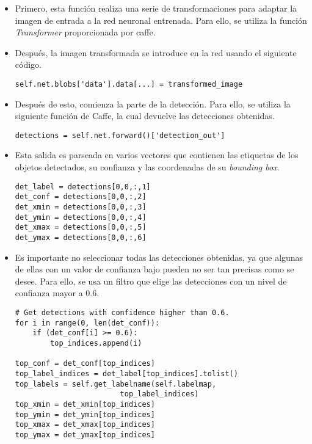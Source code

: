\documentclass[a4paper, 12pt, oneside]{book}
\begin{document}
\begin{itemize}
\item Primero, esta función realiza una serie de transformaciones para adaptar la imagen de entrada a la red neuronal entrenada. Para ello, se utiliza la función \textit{Transformer} proporcionada por caffe. 
\item Después, la imagen transformada se introduce en la red usando el siguiente código.\\

\begin{lstlisting}[frame=single]
self.net.blobs['data'].data[...] = transformed_image
\end{lstlisting}

\item Después de esto, comienza la parte de la detección. Para ello, se utiliza la siguiente función de Caffe, la cual devuelve las detecciones obtenidas.\\

\begin{lstlisting}[frame=single]
detections = self.net.forward()['detection_out']
\end{lstlisting}

\item Esta salida es parseada en varios vectores que contienen las etiquetas de los objetos detectados, su confianza y las coordenadas de su \textit{bounding box}.\\

\begin{lstlisting}[frame=single]
det_label = detections[0,0,:,1] 
det_conf = detections[0,0,:,2] 
det_xmin = detections[0,0,:,3] 
det_ymin = detections[0,0,:,4] 
det_xmax = detections[0,0,:,5] 
det_ymax = detections[0,0,:,6]
\end{lstlisting}

\item Es importante no seleccionar todas las detecciones obtenidas, ya que algunas de ellas con un valor de confianza bajo pueden no ser tan precisas como se desee. Para ello, se usa un filtro que elige las detecciones con un nivel de confianza mayor a 0.6.\\

\begin{lstlisting}[frame=single]
# Get detections with confidence higher than 0.6. 
for i in range(0, len(det_conf)): 
    if (det_conf[i] >= 0.6): 
        top_indices.append(i) 

top_conf = det_conf[top_indices] 
top_label_indices = det_label[top_indices].tolist() 
top_labels = self.get_labelname(self.labelmap, 
						top_label_indices) 
top_xmin = det_xmin[top_indices] 
top_ymin = det_ymin[top_indices] 
top_xmax = det_xmax[top_indices] 
top_ymax = det_ymax[top_indices] 
\end{lstlisting}

\end{itemize}
\end{document}
